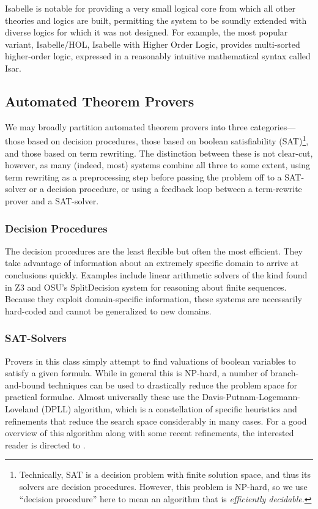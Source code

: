Isabelle is notable for providing a very small logical core from which all other theories and logics are built, permitting the system to be soundly extended with diverse logics for which it was not designed.  For example, the most popular variant, Isabelle/HOL, Isabelle with Higher Order Logic, provides multi-sorted higher-order logic, expressed in a reasonably intuitive mathematical syntax called Isar\cite{wenzelIsar}.

\subsection{Automated Theorem Provers}\label{sec:overviewProvers}
We may broadly partition automated theorem provers into three categories---those based on decision procedures, those based on boolean satisfiability (SAT)\footnote{Technically, SAT is a decision problem with finite solution space, and thus its solvers are decision procedures.  However, this problem is NP-hard, so we use ``decision procedure'' here to mean an algorithm that is \emph{efficiently decidable}.}, and those based on term rewriting.  The distinction between these is not clear-cut, however, as many (indeed, most) systems combine all three to some extent, using term rewriting as a preprocessing step before passing the problem off to a SAT-solver or a decision procedure, or using a feedback loop between a term-rewrite prover and a SAT-solver.

\subsubsection{Decision Procedures} The decision procedures are the least flexible but often the most efficient.  They take advantage of information about an extremely specific domain to arrive at conclusions quickly.  Examples include linear arithmetic solvers of the kind found in Z3\cite{deMouraZ3} and OSU's SplitDecision\cite{Sit11} system for reasoning about finite sequences.  Because they exploit domain-specific information, these systems are necessarily hard-coded and cannot be generalized to new domains.

\subsubsection{SAT-Solvers} Provers in this class simply attempt to find valuations of boolean variables to satisfy a given formula.  While in general this is NP-hard, a number of branch-and-bound techniques can be used to drastically reduce the problem space for practical formulae.  Almost universally these use the Davis-Putnam-Logemann-Loveland (DPLL) algorithm, which is a constellation of specific heuristics and refinements that reduce the search space considerably in many cases.  For a good overview of this algorithm along with some recent refinements, the interested reader is directed to \cite{nieuwenhuisDPLL}.

